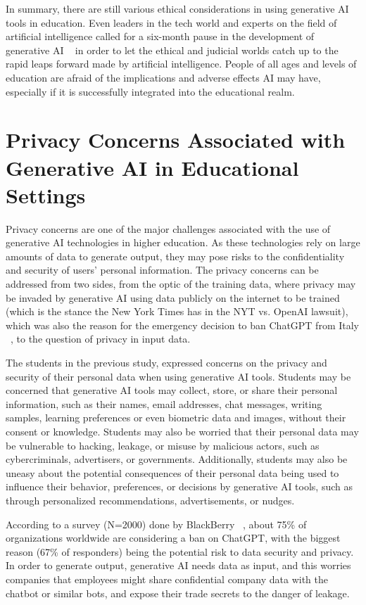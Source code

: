 \documentclass[a4paper,12pt]{report}
\begin{document}
In summary, there are still various ethical considerations in using generative AI tools in education. Even leaders in the tech world and experts on the field of artificial intelligence called for a six-month pause in the development of generative AI ~\cite{knight2023chatgpt} in order to let the ethical and judicial worlds catch up to the rapid leaps forward made by artificial intelligence. People of all ages and levels of education are afraid of the implications and adverse effects AI may have, especially if it is successfully integrated into the educational realm.

\newpage
\section{Privacy Concerns Associated with Generative AI in Educational Settings} \label{sect:privacy-concerns}
\hspace{10mm} Privacy concerns are one of the major challenges associated with the use of generative AI technologies in higher education. As these technologies rely on large amounts of data to generate output, they may pose risks to the confidentiality and security of users’ personal information. The privacy concerns can be addressed from two sides, from the optic of the training data, where privacy may be invaded by generative AI using data publicly on the internet to be trained (which is the stance the New York Times has in the NYT vs. OpenAI lawsuit), which was also the reason for the emergency decision to ban ChatGPT from Italy ~\cite{burgess2023chatgptprivacy}, to the question of privacy in input data.

The students in the previous study, expressed concerns on the privacy and security of their personal data when using generative AI tools. Students may be concerned that generative AI tools may collect, store, or share their personal information, such as their names, email addresses, chat messages, writing samples, learning preferences or even biometric data and images, without their consent or knowledge. Students may also be worried that their personal data may be vulnerable to hacking, leakage, or misuse by malicious actors, such as cybercriminals, advertisers, or governments. Additionally, students may also be uneasy about the potential consequences of their personal data being used to influence their behavior, preferences, or decisions by generative AI tools, such as through personalized recommendations, advertisements, or nudges.

According to a survey (N=2000) done by BlackBerry ~\cite{sussman2023chatgptbanning}, about 75\% of organizations worldwide are considering a ban on ChatGPT, with the biggest reason (67\% of responders) being the potential risk to data security and privacy. In order to generate output, generative AI needs data as input, and this worries companies that employees might share confidential company data with the chatbot or similar bots, and expose their trade secrets to the danger of leakage.
\end{document}

